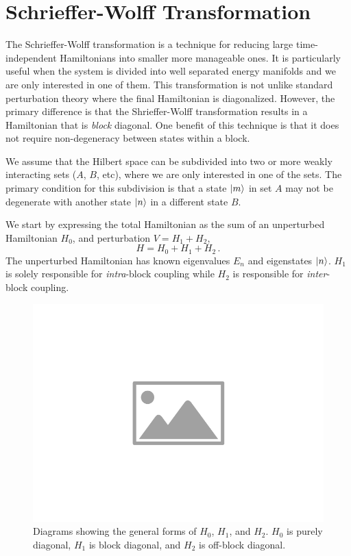 \section{Schrieffer-Wolff Transformation}\label{SEC:sw_trans}
The Schrieffer-Wolff transformation is a technique for reducing large time-independent Hamiltonians into smaller more manageable ones.
It is particularly useful when the system is divided into well separated energy manifolds and we are only interested in one of them.
This transformation is not unlike standard perturbation theory where the final Hamiltonian is diagonalized.
However, the primary difference is that the Shrieffer-Wolff transformation results in a Hamiltonian that is \emph{block} diagonal.
One benefit of this technique is that it does not require non-degeneracy between states within a block.

We assume that the Hilbert space can be subdivided into two or more weakly interacting sets ($A$, $B$, etc), where we are only interested in one of the sets. The primary condition for this subdivision is that a state $\ket{m}$ in set $A$ may not be degenerate with another state $\ket{n}$ in a different state $B$.

We start by expressing the total Hamiltonian as the sum of an unperturbed Hamiltonian $H_0$, and perturbation $V = H_1 + H_2$,
\begin{equation}
    H = H_0 + H_1 + H_2 \,.
    \label{EQ:sw_trans_init_ham}
\end{equation}
The unperturbed Hamiltonian has known eigenvalues $E_n$ and eigenstates $\ket{n}$.
$H_1$ is solely responsible for \emph{intra}-block coupling while $H_2$ is responsible for \emph{inter}-block coupling.

\begin{figure}[htbp]
    \centering
    \includegraphics[width=0.75\columnwidth]{placeholder-image}
    \caption[Shrieffer-Wolff transformation. Matrix diagrams.]{Diagrams showing the general forms of $H_0$, $H_1$, and $H_2$. $H_0$ is purely diagonal, $H_1$ is block diagonal, and $H_2$ is off-block diagonal.}
    \label{<label>}
\end{figure}

